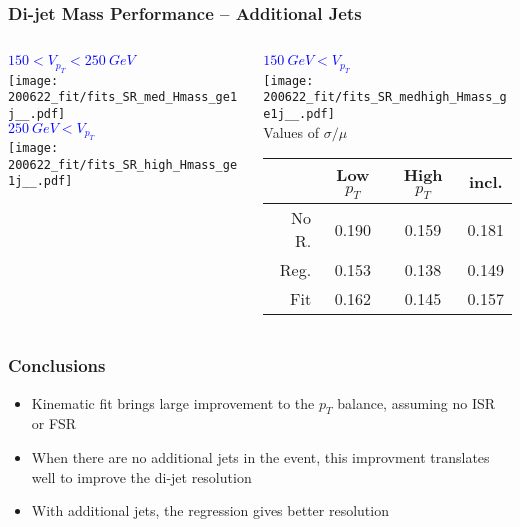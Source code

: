 \documentclass{beamer}
\newcommand{\beginbackup}{
  \newcounter{framenumbervorappendix}
  \setcounter{framenumbervorappendix}{\value{framenumber}}
}
\newcommand{\backupend}{
  \addtocounter{framenumbervorappendix}{-\value{framenumber}}
  \addtocounter{framenumber}{\value{framenumbervorappendix}}
}
\begin{document}
\begin{frame}
  \frametitle{Di-jet Mass Performance -- Additional Jets}


  \begin{columns}
    \begin{column}{0.5\linewidth}
      \centering
      \textcolor{blue}{$150 < V_{p_T} < \SI{250}{GeV}$} \\
      \texttt{[image: 200622\_fit/fits\_SR\_med\_Hmass\_ge1j\_\_.pdf]} \\
      \textcolor{blue}{$\SI{250}{GeV} < V_{p_T}$} \\
      \texttt{[image: 200622\_fit/fits\_SR\_high\_Hmass\_ge1j\_\_.pdf]}
    \end{column}
    \begin{column}{0.5\linewidth}
      \centering
      \textcolor{blue}{$\SI{150}{GeV} < V_{p_T}$} \\
      \texttt{[image: 200622\_fit/fits\_SR\_medhigh\_Hmass\_ge1j\_\_.pdf]} \\

      Values of $\sigma/\mu$
      {\scriptsize
      \begin{tabular}{|r|c|c|c|}
        \hline
        & Low $p_T$ & High $p_T$ & incl. \\
        \hline
        No R. & 0.190 & 0.159 & 0.181 \\
        Reg.  & 0.153 & 0.138 & 0.149 \\
        Fit   & 0.162 & 0.145 & 0.157 \\
        \hline
      \end{tabular}
      }
    \end{column}
  \end{columns}

\end{frame}

\begin{frame}
  \frametitle{Conclusions}

  \begin{itemize}
  \item Kinematic fit brings large improvement to the $p_T$ balance,
    assuming no ISR or FSR
  \item When there are no additional jets in the event,
    this improvment translates well to improve the di-jet resolution
  \item With additional jets, the regression gives better resolution
  \end{itemize}

\end{frame}

\begin{comment}
\beginbackup

\begin{frame}
  \centering
    {\Huge \bf\sffamily Backup Slides}
\end{frame}



\backupend
\end{comment}
\end{document}
